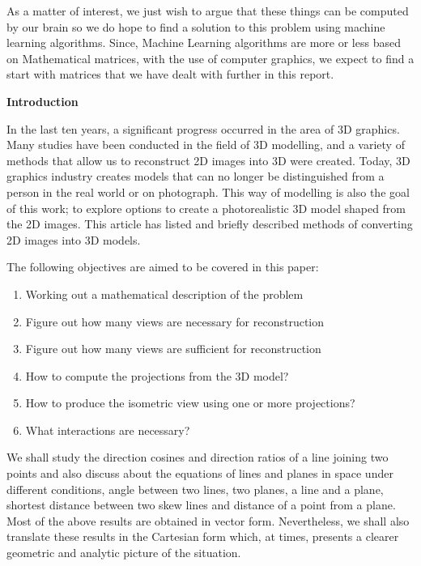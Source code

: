 \documentclass{article} %
\begin{document}
\noindent 

\noindent As a matter of interest, we just wish to argue that these things can be computed by our brain so we do hope to find a solution to this problem using machine learning algorithms. Since, Machine Learning algorithms are more or less based on Mathematical matrices, with the use of computer graphics, we expect to find a start with matrices that we have dealt with further in this report. 

\noindent 

\noindent \textbf{Introduction}

\noindent 

\noindent In the last ten years, a significant progress occurred in the area of 3D graphics. Many studies have been conducted in the field of 3D modelling, and a variety of methods that allow us to reconstruct 2D images into 3D were created. Today, 3D graphics industry creates models that can no longer be distinguished from a person in the real world or on photograph. This way of modelling is also the goal of this work; to explore options to create a photorealistic 3D model shaped from the 2D images. This article has listed and briefly described methods of converting 2D images into 3D models.

\noindent 

\noindent The following objectives are aimed to be covered in this paper:

\noindent 

\begin{enumerate}
\item  Working out a mathematical description of the problem

\item  Figure out how many views are necessary for reconstruction

\item  Figure out how many views are sufficient for reconstruction

\item  How to compute the projections from the 3D model?

\item  How to produce the isometric view using one or more projections?

\item  What interactions are necessary?
\end{enumerate}

\noindent 

\noindent We shall study the direction cosines and direction ratios of a line joining two points and also discuss about the equations of lines and planes in space under different conditions, angle between two lines, two planes, a line and a plane, shortest distance between two skew lines and distance of a point from a plane. Most of the above results are obtained in vector form. Nevertheless, we shall also translate these results in the Cartesian form which, at times, presents a clearer geometric and analytic picture of the situation.
\end{document}
